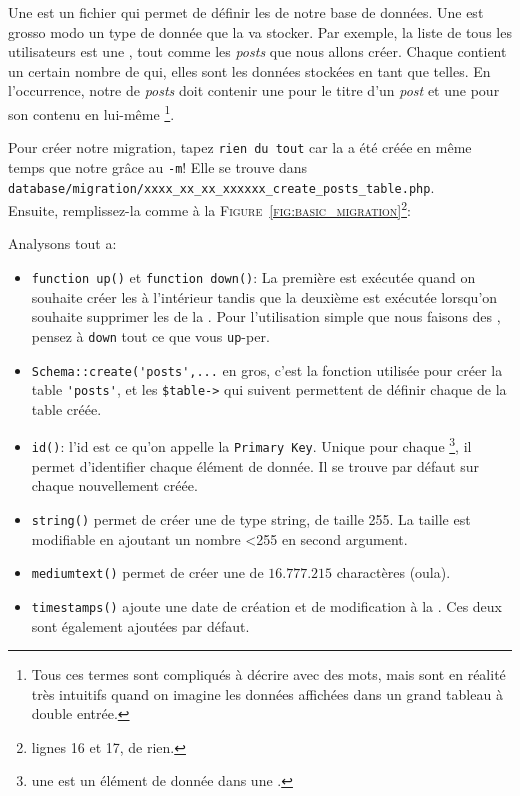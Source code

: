 Une \migration{} est un fichier qui permet de définir les \tables{} de notre base de données. Une \table{} est grosso modo un type de donnée que la \db{} va stocker. Par exemple, la liste de tous les utilisateurs est une \table{}, tout comme les \textit{posts} que nous allons créer. Chaque \table{} contient un certain nombre de \columns{} qui, elles sont les données stockées en tant que telles. En l'occurrence, notre \table{} de \textit{posts} doit contenir une \column{} pour le titre d'un \textit{post} et une pour son contenu en lui-même \footnote{Tous ces termes sont compliqués à décrire avec des mots, mais sont en réalité très intuitifs quand on imagine les données affichées dans un grand tableau à double entrée.}.

Pour créer notre migration, tapez \verb|rien du tout| car la \migration{} a été créée en même temps que notre \model{} grâce au \verb|-m|! Elle se trouve dans \\\verb|database/migration/xxxx_xx_xx_xxxxxx_create_posts_table.php|. \\Ensuite, remplissez-la comme à la \textsc{Figure~\ref{fig:basic_migration}}\footnote{lignes 16 et 17, de rien.}:

Analysons tout a:
\begin{itemize}
    \item \verb|function up()| et \verb|function down()|: La première est exécutée quand on souhaite créer les \tables{} à l'intérieur tandis que la deuxième est exécutée lorsqu'on souhaite supprimer les \tables{} de la \db{}. Pour l'utilisation simple que nous faisons des \migrations{}, pensez à \verb|down| tout ce que vous \verb|up|-per.
    \item \verb|Schema::create('posts',...| en gros, c'est la fonction utilisée pour créer la table \verb|'posts'|, et les \verb|$table->| qui suivent permettent de définir chaque \column{} de la table créée.
    \item \verb|id()|: l'id est ce qu'on appelle la \texttt{Primary Key}. Unique pour chaque \row{}\footnote{une \row{} est un élément de donnée dans une \table{}.}, il permet d'identifier chaque élément de donnée. Il se trouve par défaut sur chaque \table{} nouvellement créée.
    \item \verb|string()| permet de créer une \column{} de type string, de taille 255. La taille est modifiable en ajoutant un nombre <255 en second argument.
    \item \verb|mediumtext()| permet de créer une \column{} de $16.777.215$ charactères (oula).
    \item \verb|timestamps()| ajoute une date de création et de modification à la \table{}. Ces deux \columns{} sont également ajoutées par défaut.
\end{itemize}

